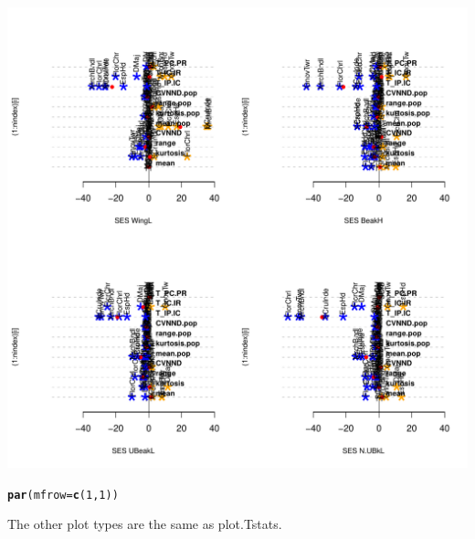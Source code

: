 \documentclass[12pt]{article}\usepackage[]{graphicx}\usepackage[]{color}
\makeatletter
\def\maxwidth{ %
  \ifdim\Gin@nat@width>\linewidth
    \linewidth
  \else
    \Gin@nat@width
  \fi
}
\newcommand{\hlnum}[1]{\textcolor[rgb]{0.686,0.059,0.569}{#1}}%
\newcommand{\hlstd}[1]{\textcolor[rgb]{0.345,0.345,0.345}{#1}}%
\newcommand{\hlkwc}[1]{\textcolor[rgb]{0.333,0.667,0.333}{#1}}%
\newcommand{\hlkwd}[1]{\textcolor[rgb]{0.737,0.353,0.396}{\textbf{#1}}}%
\newenvironment{kframe}{%
 \def\at@end@of@kframe{}%
 \ifinner\ifhmode%
  \def\at@end@of@kframe{\end{minipage}}%
  \begin{minipage}{\columnwidth}%
 \fi\fi%
 \def\FrameCommand##1{\hskip\@totalleftmargin \hskip-\fboxsep
 \colorbox{shadecolor}{##1}\hskip-\fboxsep
     \hskip-\linewidth \hskip-\@totalleftmargin \hskip\columnwidth}%
 \MakeFramed {\advance\hsize-\width
   \@totalleftmargin\z@ \linewidth\hsize
   \@setminipage}}%
 {\par\unskip\endMakeFramed%
 \at@end@of@kframe}
\newenvironment{knitrout}{}{} %
\makeatother
\begin{document}
\begin{knitrout}
\includegraphics[width=\maxwidth]{figure/unnamed-chunk-502} 
\begin{kframe}\begin{alltt}
\hlkwd{par}\hlstd{(}\hlkwc{mfrow} \hlstd{=} \hlkwd{c}\hlstd{(}\hlnum{1}\hlstd{,}\hlnum{1}\hlstd{))}
\end{alltt}
\end{kframe}
\end{knitrout}

The other plot types are the same as plot.Tstats.
\end{document}
